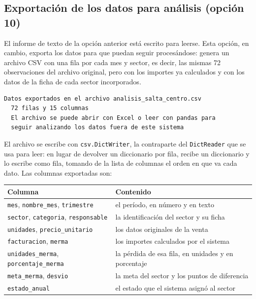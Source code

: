 \documentclass[12pt]{article}
\newcommand{\codigo}[1]{\texttt{\small #1}}
\begin{document}
\newpage

\subsection{Exportación de los datos para análisis (opción 10)}

El informe de texto de la opción anterior está escrito para leerse. Esta opción, en cambio, exporta los datos para que puedan seguir procesándose: genera un archivo CSV con una fila por cada mes y sector, es decir, las mismas 72 observaciones del archivo original, pero con los importes ya calculados y con los datos de la ficha de cada sector incorporados.

\begin{lstlisting}[style=salida]
  Datos exportados en el archivo analisis_salta_centro.csv
  72 filas y 15 columnas
  El archivo se puede abrir con Excel o leer con pandas para
  seguir analizando los datos fuera de este sistema
\end{lstlisting}

El archivo se escribe con \codigo{csv.DictWriter}, la contraparte del \codigo{DictReader} que se usa para leer: en lugar de devolver un diccionario por fila, recibe un diccionario y lo escribe como fila, tomando de la lista de columnas el orden en que va cada dato. Las columnas exportadas son:

\begin{center}
\small
\begin{tabular}{ll}
    \toprule
    \textbf{Columna} & \textbf{Contenido} \\
    \midrule
    \codigo{mes}, \codigo{nombre\_mes}, \codigo{trimestre} & el período, en número y en texto \\
    \codigo{sector}, \codigo{categoria}, \codigo{responsable} & la identificación del sector y su ficha \\
    \codigo{unidades}, \codigo{precio\_unitario} & los datos originales de la venta \\
    \codigo{facturacion}, \codigo{merma} & los importes calculados por el sistema \\
    \codigo{unidades\_merma}, \codigo{porcentaje\_merma} & la pérdida de esa fila, en unidades y en porcentaje \\
    \codigo{meta\_merma}, \codigo{desvio} & la meta del sector y los puntos de diferencia \\
    \codigo{estado\_anual} & el estado que el sistema asignó al sector \\
    \bottomrule
\end{tabular}
\end{center}
\end{document}

